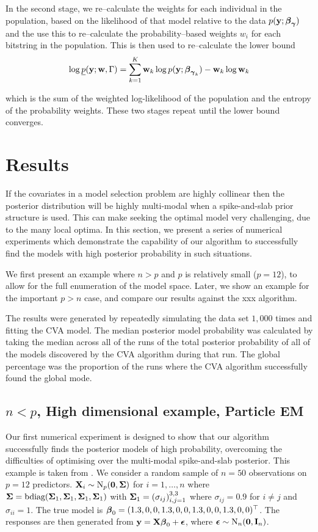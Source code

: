 \documentclass{amsart}[12pt]
\begin{document}
In the second stage, we re--calculate the weights for each individual in the population, based on the
likelihood of that model relative to the data $p({\bf y}; {\boldsymbol \beta}_{\boldsymbol \gamma})$ and the use this to re--calculate the
probability--based weights $w_i$ for each bitstring in the population. This is then used to re--calculate the
lower bound
\[
	\log \underline{p}({\bf y}; {\bf w}, \Gamma) = \sum_{k=1}^K {\bf w}_k \log p({\bf y}; {\boldsymbol \beta}_{{\boldsymbol \gamma}_k}) - {\bf w}_k \log {\bf w}_k
\]

which is the sum of the weighted log-likelihood of the population and the entropy of the probability weights.
These two stages repeat until the lower bound converges.

\section{Results}

If the covariates in a model selection problem are highly collinear then the posterior distribution will be
highly multi-modal when a spike-and-slab prior structure is used. This can make seeking the optimal model very
challenging, due to the many local optima. In this section, we present a series of numerical experiments which
demonstrate the capability of our algorithm to successfully find the models with high posterior probability in
such situations.

We first present an example where $n > p$ and $p$ is relatively small ($p = 12$), to allow for the full 
enumeration of the model space. Later, we show an example for the important $p > n$ case, and compare our results 
against the xxx algorithm.

The results were generated by repeatedly simulating the data set $1,000$ times and fitting the CVA model.
The median posterior model probability was calculated by taking the median across all of the runs of the
total posterior probability of all of the models discovered by the CVA algorithm during that run. The global
percentage was the proportion of the runs where the CVA algorithm successfully found the global mode.

\subsection{$n < p$, High dimensional example, Particle EM}

Our first numerical experiment is designed to show that our algorithm successfully finds the posterior models
of high probability, overcoming the difficulties of optimising over the multi-modal spike-and-slab posterior.
This example is taken from \citep{Rockova2016}. 
We consider a random sample of $n = 50$ observations on $p = 12$ predictors. ${\bf X}_i \sim \text{N}_p({\bf 0}, {\boldsymbol \Sigma})$
for $i = 1, \ldots, n$ where
${\boldsymbol \Sigma} = \text{bdiag}({\boldsymbol \Sigma}_1, {\boldsymbol \Sigma}_1, {\boldsymbol \Sigma}_1, {\boldsymbol \Sigma}_1)$ with
${\boldsymbol \Sigma}_1 = (\sigma_{ij})_{i, j = 1}^{3, 3}$ where $\sigma_{ij} = 0.9$ for $i \ne j$ and $\sigma_{ii} = 1$.
The true model is ${\boldsymbol \beta}_0 = (1.3, 0, 0, 1.3, 0, 0, 1.3, 0, 0, 1.3, 0, 0)^\top$.
The responses are then generated from ${\bf y} = {\bf X} {\boldsymbol \beta}_0 + {\boldsymbol \epsilon}$, where
${\boldsymbol \epsilon} \sim \text{N}_n({\bf 0}, {\bf I}_n)$.
\end{document}
